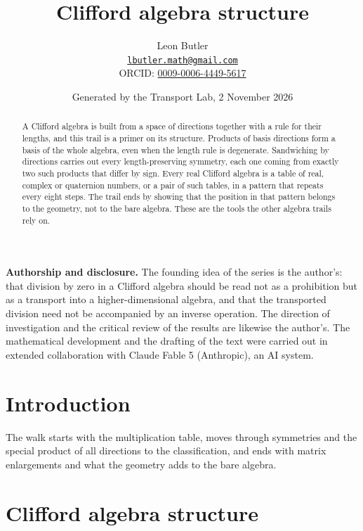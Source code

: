 \documentclass[11pt]{article}
\title{\bfseries Clifford algebra structure}
\author{Leon Butler\\ \normalsize\href{mailto:lbutler.math@gmail.com}{\texttt{lbutler.math@gmail.com}}\\ \normalsize ORCID: \href{https://orcid.org/0009-0006-4449-5617}{0009-0006-4449-5617}}
\date{Generated by the Transport Lab, 2 November 2026}
\theoremstyle{definition}
\theoremstyle{plain}
\begin{document}
\maketitle
\begin{abstract}
\normalsize
A Clifford algebra is built from a space of directions together with a rule for their lengths, and this trail is a primer on its structure. Products of basis directions form a basis of the whole algebra, even when the length rule is degenerate. Sandwiching by directions carries out every length-preserving symmetry, each one coming from exactly two such products that differ by sign. Every real Clifford algebra is a table of real, complex or quaternion numbers, or a pair of such tables, in a pattern that repeats every eight steps. The trail ends by showing that the position in that pattern belongs to the geometry, not to the bare algebra. These are the tools the other algebra trails rely on.
\end{abstract}
\newpage
\noindent \textbf{Authorship and disclosure. }The founding idea of the series is the author's: that division by zero in a Clifford algebra should be read not as a prohibition but as a transport into a higher-dimensional algebra, and that the transported division need not be accompanied by an inverse operation. The direction of investigation and the critical review of the results are likewise the author's. The mathematical development and the drafting of the text were carried out in extended collaboration with Claude Fable 5 (Anthropic), an AI system.

\noindent{}
\newpage

\section*{Introduction}
The walk starts with the multiplication table, moves through symmetries and the special product of all directions to the classification, and ends with matrix enlargements and what the geometry adds to the bare algebra.

\section{Clifford algebra structure}
\end{document}
